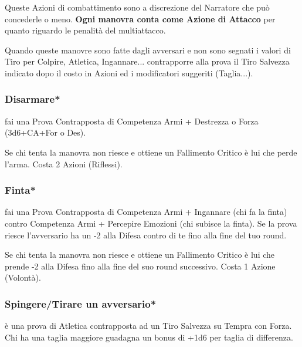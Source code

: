 \begin{multicols}{2}
Queste Azioni di combattimento sono a discrezione del Narratore che può concederle o meno. \textbf{Ogni manovra conta come Azione di Attacco} per quanto riguardo le penalità del multiattacco.

Quando queste manovre sono fatte dagli avversari e non sono segnati i valori di Tiro per Colpire, Atletica, Ingannare... contrapporre alla prova il Tiro Salvezza indicato dopo il costo in Azioni ed i modificatori suggeriti (Taglia...).

\medskip

\subsubsection{Disarmare*}\label{disarmare}\hypertarget{disarmare}{}

fai una Prova Contrapposta di Competenza Armi + Destrezza o Forza (3d6+CA+For o Des).

Se chi tenta la manovra non riesce e ottiene un Fallimento Critico è lui che perde l'arma. Costa 2 Azioni (Riflessi).

\subsubsection{Finta*} \label{finta}\hypertarget{finta}{}

fai una Prova Contrapposta di Competenza Armi + Ingannare (chi fa la finta) contro Competenza Armi + Percepire Emozioni (chi subisce la finta). Se la prova riesce l'avversario ha un -2 alla Difesa contro di te fino alla fine del tuo round.

Se chi tenta la manovra non riesce e ottiene un Fallimento Critico è lui che prende -2 alla Difesa fino alla fine del suo round successivo. Costa 1 Azione (Volontà).


\subsubsection{Spingere/Tirare un avversario*} \label{spingereavversario}\hypertarget{spingereavversario}{}

è una prova di Atletica contrapposta ad un Tiro Salvezza su Tempra con Forza. Chi ha una taglia maggiore guadagna un bonus di +1d6 per taglia di differenza.


\end{multicols}
